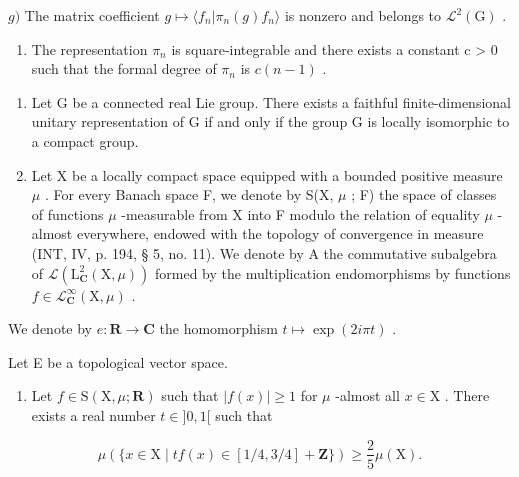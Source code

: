 \(g)\) The matrix coefficient \(g \mapsto \langle f_n | \pi_n(g)f_n \rangle\) is nonzero and belongs to \(\mathcal{L}^2(\mathrm{G})\) .

\begin{enumerate}
\def\labelenumi{\alph{enumi})}
\setcounter{enumi}{7}
\tightlist
\item
  The representation \(\pi_{n}\) is square-integrable and there exists a constant c > 0 such that the formal degree of \(\pi_{n}\) is \(c(n - 1)\) .
\end{enumerate}

\begin{enumerate}
\def\labelenumi{\arabic{enumi})}
\setcounter{enumi}{16}
\item
  Let G be a connected real Lie group. There exists a faithful finite-dimensional unitary representation of G if and only if the group G is locally isomorphic to a compact group.
\item
  Let X be a locally compact space equipped with a bounded positive measure \(\mu\) . For every Banach space F, we denote by S(X, \(\mu\) ; F) the space of classes of functions \(\mu\) -measurable from X into F modulo the relation of equality \(\mu\) -almost everywhere, endowed with the topology of convergence in measure (INT, IV, p. 194, § 5, no. 11). We denote by A the commutative subalgebra of \(\mathcal{L}(\mathrm{L}_{\mathbf{C}}^{2}(\mathrm{X},\mu))\) formed by the multiplication endomorphisms by functions \(f \in \mathcal{L}_{\mathbf{C}}^{\infty}(\mathrm{X},\mu)\) .
\end{enumerate}

We denote by \(e\colon \mathbf{R}\to \mathbf{C}\) the homomorphism \(t\mapsto \exp (2i\pi t)\) .

Let E be a topological vector space.

\begin{enumerate}
\def\labelenumi{\alph{enumi})}
\tightlist
\item
  Let \(f \in \mathrm{S}(\mathrm{X}, \mu; \mathbf{R})\) such that \(|f(x)| \geqslant 1\) for \(\mu\) -almost all \(x \in \mathrm{X}\) . There exists a real number \(t \in ]0, 1[\) such that
\end{enumerate}

\[
\mu (\{x \in \mathrm{X} \mid t f (x) \in [ 1 / 4, 3 / 4 ] + \mathbf {Z} \}) \geqslant \frac {2}{5} \mu (\mathrm{X}).
\]

